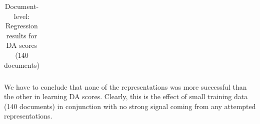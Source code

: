 \begin{table}[H]
\begin{tabular}{l|cl|cl}
		\bottomrule
	\end{tabular}
\caption{\label{tab:da_doc_res}Document-level: Regression results for DA scores (140 documents)}
\end{table}

We have to conclude that none of the representations was more successful than the other in learning DA scores. Clearly, this is the effect of small training data (140 documents) in conjunction with no strong signal coming from any attempted representations. 

